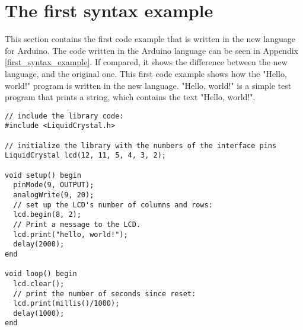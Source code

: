 \section{The first syntax example}\label{sec:code_examples}
This section contains the first code example that is written in the new language for Arduino. The code written in the Arduino language can be seen in Appendix \ref{first_syntax_example}. If compared, it shows the difference between the new language, and the original one. This first code example shows how the "Hello, world!" program is written in the new language. "Hello, world!" is a simple test program that prints a string, which contains the text "Hello, world!".
 
\begin{lstlisting}[caption=Hello World code example based on the source language, label=lst:syntax1]
// include the library code:
#include <LiquidCrystal.h>

// initialize the library with the numbers of the interface pins
LiquidCrystal lcd(12, 11, 5, 4, 3, 2);

void setup() begin
  pinMode(9, OUTPUT);
  analogWrite(9, 20);
  // set up the LCD's number of columns and rows: 
  lcd.begin(8, 2);
  // Print a message to the LCD.
  lcd.print("hello, world!");
  delay(2000);
end

void loop() begin
  lcd.clear();
  // print the number of seconds since reset:
  lcd.print(millis()/1000);
  delay(1000);
end
\end{lstlisting}
